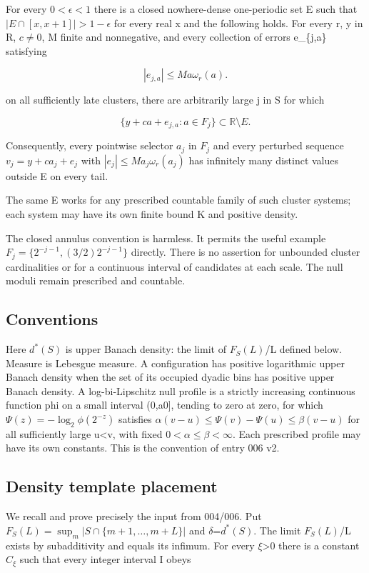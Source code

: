 \documentclass[
  11pt,
]{article}
\theoremstyle{remark}\newtheorem{remark}[theorem]{Remark}
\begin{document}
For every \(0<\epsilon<1\) there is a closed nowhere-dense one-periodic
set E such that \(|E\cap[x,x+1]|>1-\epsilon\) for every real x and the
following holds. For every r, y in R, \(c\ne0\), M finite and
nonnegative, and every collection of errors e\_\{j,a\} satisfying

\[
|e_{j,a}|\le M a\omega_r(a).
\]

on all sufficiently late clusters, there are arbitrarily large j in S
for which

\[
\{y+ca+e_{j,a}:a\in F_j\}\subset\mathbb R\setminus E.\tag{A.1}
\]

Consequently, every pointwise selector \(a_j\) in \(F_j\) and every
perturbed sequence \(v_j=y+ca_j+e_j\) with
\(|e_j|\le Ma_j\omega_r(a_j)\) has infinitely many distinct values
outside E on every tail.

The same E works for any prescribed countable family of such cluster
systems; each system may have its own finite bound K and positive
density.

The closed annulus convention is harmless. It permits the useful example
\(F_j=\{2^{-j-1},(3/2)2^{-j-1}\}\) directly. There is no assertion for
unbounded cluster cardinalities or for a continuous interval of
candidates at each scale. The null moduli remain prescribed and
countable.

\subsection{Conventions}\label{conventions}

Here \(d^*(S)\) is upper Banach density: the limit of \(F_S(L)\)/L
defined below. Measure is Lebesgue measure. A configuration has positive
logarithmic upper Banach density when the set of its occupied dyadic
bins has positive upper Banach density. A log-bi-Lipschitz null profile
is a strictly increasing continuous function phi on a small interval
(0,a0{]}, tending to zero at zero, for which
\(\Psi(z)=-\log_2\phi(2^{-z})\) satisfies
\(\alpha(v-u)\le\Psi(v)-\Psi(u)\le\beta(v-u)\) for all sufficiently
large u\textless v, with fixed \(0<\alpha\le\beta<\infty\). Each
prescribed profile may have its own constants. This is the convention of
entry 006 v2.

\subsection{Density template
placement}\label{density-template-placement}

We recall and prove precisely the input from 004/006. Put
\(F_S(L)=\sup_m|S\cap\{m+1,\ldots,m+L\}|\) and \(\delta\)=\(d^*(S)\).
The limit \(F_S(L)\)/L exists by subadditivity and equals its infimum.
For every \(\xi\)\textgreater0 there is a constant \(C_\xi\) such that
every integer interval I obeys
\end{document}
